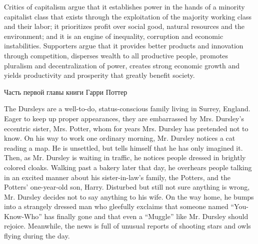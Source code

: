 Critics of capitalism argue that it establishes power in the hands of a minority capitalist class that exists through the exploitation of the majority working class and their labor; it prioritizes profit over social good, natural resources and the environment; and it is an engine of inequality, corruption and economic instabilities. Supporters argue that it provides better products and innovation through competition, disperses wealth to all productive people, promotes pluralism and decentralization of power, creates strong economic growth and yields productivity and prosperity that greatly benefit society.


\thispagestyle{empty}
\newpage

\begin{flushright}
{} 
\end{flushright}
\begin{center}
Часть первой главы книги Гарри Поттер
\end{center}

The Dursleys are a well-to-do, status-conscious family living in Surrey, England. Eager to keep up proper appearances, they are embarrassed by Mrs. Dursley’s eccentric sister, Mrs. Potter, whom for years Mrs. Dursley has pretended not to know. On his way to work one ordinary morning, Mr. Dursley notices a cat reading a map. He is unsettled, but tells himself that he has only imagined it. Then, as Mr. Dursley is waiting in traffic, he notices people dressed in brightly colored cloaks. Walking past a bakery later that day, he overhears people talking in an excited manner about his sister-in-law’s family, the Potters, and the Potters’ one-year-old son, Harry. Disturbed but still not sure anything is wrong, Mr. Dursley decides not to say anything to his wife. On the way home, he bumps into a strangely dressed man who gleefully exclaims that someone named “You-Know-Who” has finally gone and that even a “Muggle” like Mr. Dursley should rejoice. Meanwhile, the news is full of unusual reports of shooting stars and owls flying during the day.

